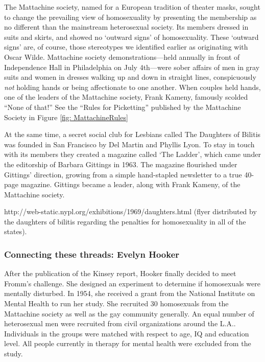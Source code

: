 The Mattachine society, named for a European tradition of theater masks, sought to change the prevailing view of homosexuality by presenting the membership as no different than the mainstream heterosexual society. Its members dressed in suits and skirts, and showed no `outward signs' of homosexuality. These `outward signs' are, of course, those stereotypes we identified earlier as originating with Oscar Wilde. Mattachine society demonstrations---held annually in front of Independence Hall in Philadelphia on July 4th---were sober affairs of men in gray suits and women in dresses walking up and down in straight lines, conspicuously \emph{not} holding hands or being affectionate to one another. When couples held hands, one of the leaders of the Mattachine society, Frank Kameny, famously scolded “None of that!” See the ``Rules for Picketting'' published by the Mattachine Society in Figure \ref{fig: MattachineRules}

At the same time, a secret social club for Lesbians called The Daughters of Bilitis was founded in San Francisco by Del Martin and Phyllis Lyon. To stay in touch with its members they created a magazine called `The Ladder', which came under the editorship of Barbara Gittings in 1963. The magazine flourished under Gittings' direction, growing from a simple hand-stapled newsletter to a true 40-page magazine. Gittings became a leader, along with Frank Kameny, of the Mattachine society.

http:\slash \slash web-static.nypl.org\slash exhibitions\slash 1969\slash daughters.html (flyer distributed by the daughters of bilitis regarding the penalties for homosexuality in all of the states).

\subsubsection{Connecting these threads: Evelyn Hooker}
\label{connectingthesethreads:evelynhooker}

After the publication of the Kinsey report, Hooker finally decided to meet Fromm's challenge. She designed an experiment to determine if homosexuals were mentally disturbed. In 1954, she received a grant from the National Institute on Mental Health to run her study. She recruited 30 homosexuals from the Mattachine society as well as the gay community generally. An equal number of heterosexual men were recruited from civil organizations around the L.A.. Individuals in the groups were matched with respect to age, IQ and education level. All people currently in therapy for mental health were excluded from the study. 

